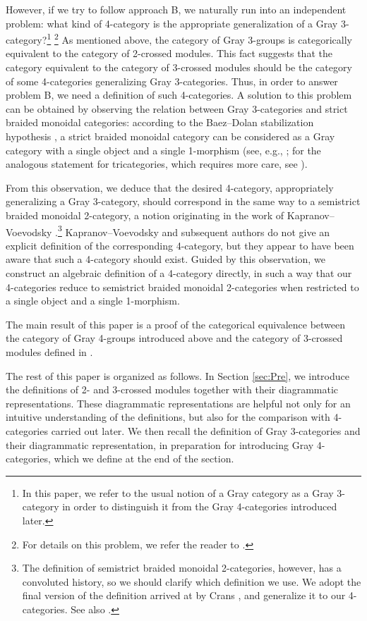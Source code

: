 \documentclass[11pt, reqno]{amsart} %
\theoremstyle{definition}
\theoremstyle{remark}
\numberwithin{equation}{section}
\begin{document}
However, if we try to follow approach B, we naturally run into an independent problem: what kind of 4-category is the appropriate generalization of a Gray 3-category?\footnote{In this paper, we refer to the usual notion of a Gray category as a Gray 3-category in order to distinguish it from the Gray 4-categories introduced later.} \footnote{For details on this problem, we refer the reader to \cite{Crans:1999,Bourke:2023,Miranda:2024}.} As mentioned above, the category of Gray 3-groups is categorically equivalent to the category of 2-crossed modules. This fact suggests that the category equivalent to the category of 3-crossed modules should be the category of some 4-categories generalizing Gray 3-categories. Thus, in order to answer problem B, we need a definition of such 4-categories. A solution to this problem can be obtained by observing the relation between Gray 3-categories and strict braided monoidal categories: according to the Baez--Dolan stabilization hypothesis \cite{Baez:1995xq}, a strict braided monoidal category can be considered as a Gray category with a single object and a single 1-morphism (see, e.g., \cite{Crans:1998}; for the analogous statement for tricategories, which requires more care, see \cite{ChengGurski2011}). 

From this observation, we deduce that the desired 4-category, appropriately generalizing a Gray 3-category, should correspond in the same way to a semistrict braided monoidal 2-category, a notion originating in the work of Kapranov--Voevodsky \cite{Kapranov:1994}.\footnote{The definition of semistrict braided monoidal 2-categories, however, has a convoluted history, so we should clarify which definition we use. We adopt the final version of the definition arrived at by Crans \cite{Crans:1998}, and generalize it to our 4-categories. See also \cite{Baez:1996}.} Kapranov--Voevodsky and subsequent authors \cite{Baez:1996,Crans:1998} do not give an explicit definition of the corresponding 4-category, but they appear to have been aware that such a 4-category should exist. Guided by this observation, we construct an algebraic definition of a 4-category directly, in such a way that our 4-categories reduce to semistrict braided monoidal 2-categories when restricted to a single object and a single 1-morphism.

The main result of this paper is a proof of the categorical equivalence between the category of Gray 4-groups introduced above and the category of 3-crossed modules defined in \cite{Fukuda:2025}.

The rest of this paper is organized as follows. In Section \ref{sec:Pre}, we introduce the definitions of 2- and 3-crossed modules together with their diagrammatic representations. These diagrammatic representations are helpful not only for an intuitive understanding of the definitions, but also for the comparison with 4-categories carried out later. We then recall the definition of Gray 3-categories and their diagrammatic representation, in preparation for introducing Gray 4-categories, which we define at the end of the section.
\end{document}
